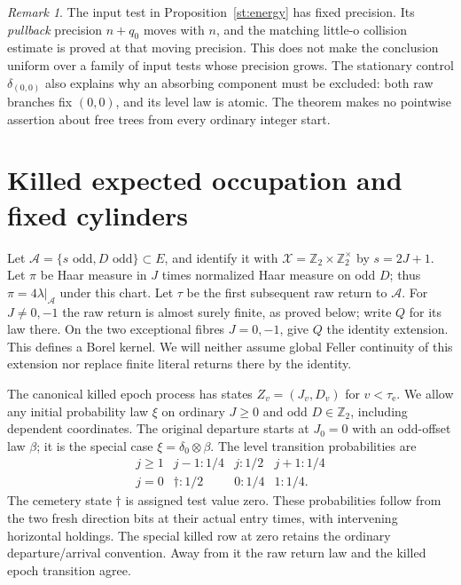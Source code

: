 \documentclass[11pt]{amsart}
\theoremstyle{definition}
\theoremstyle{remark}
\newtheorem{remark}[theorem]{Remark}
\newcommand{\Ztwo}{\mathbb Z_2}
\begin{document}
\begin{remark}\label{st:precision-scope}
The input test in Proposition~\ref{st:energy} has fixed precision.  Its
\emph{pullback} precision $n+q_0$ moves with $n$, and the matching
little-o collision estimate is proved at that moving precision.  This
does not make the conclusion uniform over a family of input tests whose
precision grows.  The stationary control $\delta_{(0,0)}$ also explains
why an absorbing component must be excluded: both raw branches fix
$(0,0)$, and its level law is atomic.  The theorem makes no pointwise assertion about free trees
from every ordinary integer start.
\end{remark}

\section{Killed expected occupation and fixed cylinders}
\label{occ:section}

Let $\mathcal A=\{s\text{ odd},D\text{ odd}\}\subset E$, and identify it with
$\mathcal X=\Ztwo\times\Ztwo^\times$ by $s=2J+1$.  Let $\pi$ be Haar measure
in $J$ times normalized Haar measure on odd $D$; thus
$\pi=4\lambda|_{\mathcal A}$ under this chart.  Let $\tau$ be the first subsequent
raw return to $\mathcal A$.  For $J\ne0,-1$ the raw return is almost surely finite,
as proved below; write $Q$ for its law there.  On the two exceptional
fibres $J=0,-1$, give $Q$ the identity extension.  This defines a Borel
kernel.  We will neither assume global Feller continuity of this
extension nor replace finite literal returns there by the identity.

The canonical killed epoch process has states $Z_v=(J_v,D_v)$ for
$v<\tau_{\mathrm e}$.  We allow any initial probability law $\xi$ on
ordinary $J\ge0$ and odd $D\in\Ztwo$, including dependent coordinates.
The original departure starts at $J_0=0$ with an odd-offset law $\beta$;
it is the special case $\xi=\delta_0\otimes\beta$.
The level transition probabilities are
\begin{equation}
 \begin{array}{c|ccc}
 j\ge1&j-1:1/4&j:1/2&j+1:1/4\\
 j=0&\dagger:1/2&0:1/4&1:1/4.
 \end{array}
 \label{occ:killed-level}
\end{equation}
The cemetery state $\dagger$ is assigned test value zero.  These
probabilities follow from the two fresh direction bits at their actual
entry times, with intervening horizontal holdings.  The special killed
row at zero retains the ordinary departure/arrival convention.
Away from it the raw return law and the killed epoch transition agree.
\end{document}
